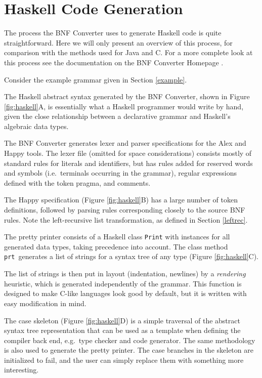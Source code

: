 \section{Haskell Code Generation}

The process the BNF Converter uses to generate Haskell code is quite straightforward. Here we will only present an overview of this process, for comparison with the methods used for Java and C. For a more complete look at this process see the documentation on the BNF Converter Homepage \cite{bnfcsite}.


Consider the example grammar given in Section \ref{example}.

The Haskell abstract syntax generated by the
BNF Converter, shown in Figure \ref{fig:haskell}A, is essentially what a Haskell programmer would write by hand, given the close relationship between a declarative grammar and Haskell's algebraic data types.


The BNF Converter generates lexer and parser specifications for the Alex \cite{alex} and Happy \cite{happy} tools. The lexer file (omitted for space considerations) consists mostly of standard rules for literals and identifiers, but has
rules added for reserved words and symbols (i.e.\ terminals
occurring in the grammar), regular expressions defined with the token pragma, and comments.

The Happy specification (Figure \ref{fig:haskell}B) has a large number of token definitions,
followed by parsing rules corresponding closely to the source BNF rules. Note the left-recursive list transformation, as defined in Section \ref{leftrec}.


The pretty printer consists of a Haskell class {\tt Print} with instances
for all generated data types, taking precedence into account. The class method
{\tt prt}\
generates a list of strings for a syntax tree of any type (Figure \ref{fig:haskell}C).

The list of strings is then put in layout (indentation, newlines) by a \textit{rendering}
heuristic, which is generated independently of the grammar. This function is designed to make C-like languages look good by default, but it is written with easy modification in mind.

The case skeleton (Figure \ref{fig:haskell}D) is a simple traversal of the abstract syntax tree representation that can be used as a template when defining the compiler
back end, e.g.\ type checker and code generator. The same methodology is
also used to generate the pretty printer. The case branches in the skeleton
are initialized to fail, and the user can simply replace them with something more interesting.

